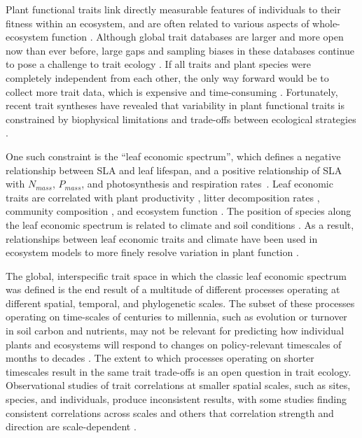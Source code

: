 \documentclass{article}
\begin{document}
Plant functional traits link directly measurable features of individuals to their fitness within an ecosystem, and are often related to various aspects of whole-ecosystem function \citep{violle_2007_let,cardinale_2012_biodiversity}.
Although global trait databases are larger and more open now than ever before, large gaps and sampling biases in these databases continue to pose a challenge to trait ecology \citep{cornwell_2019_what}.
If all traits and plant species were completely independent from each other, the only way forward would be to collect more trait data, which is expensive and time-consuming \citep{cornwell_2019_what}.
Fortunately, recent trait syntheses have revealed that variability in plant functional traits is constrained by biophysical limitations and trade-offs between ecological strategies \citep{kattge_2011_try,wright_2004_worldwide,kleyer_2015_why,diaz_2015_global}.

One such constraint is the ``leaf economic spectrum'', which defines a negative relationship between SLA and leaf lifespan, and a positive relationship of SLA with $N_{mass}$, $P_{mass}$, and photosynthesis and respiration rates~\citep{wright_2004_worldwide,shipley_2006_fundamental,reich_2014_world,diaz_2015_global}.
Leaf economic traits are correlated with
plant productivity \citep{shipley_2005_functional,niinemets_2016_within,wu_2016_convergence},
litter decomposition rates \citep{bakker_2010_leaf,hobbie_2015_plant},
community composition \citep{burns_2004_patterns,cavender-bares_2004_multiple},
and ecosystem function \citep{diaz_2004_plant,musavi_2015_imprint}.
The position of species along the leaf economic spectrum is related to climate and soil conditions
\citep{wright_2004_worldwide,wright_2005_modulation,cornwell_2009_community,ordonez_2009_global,wigley_2016_leaf}.
As a result, relationships between leaf economic traits and climate have been used in ecosystem models to more finely resolve variation in plant function \citep{sakschewski_2015_leaf,verheijen_2015_inclusion,scheiter_2013_next}.

The global, interspecific trait space in which the classic leaf economic spectrum was defined is the end result of a multitude of different processes operating at different spatial, temporal, and phylogenetic scales.
The subset of these processes operating on time-scales of centuries to millennia, such as evolution or turnover in soil carbon and nutrients,
may not be relevant for predicting how individual plants and ecosystems will respond to changes on policy-relevant timescales of months to decades \citep{shaw_2012_rapid}.
The extent to which processes operating on shorter timescales result in the same trait trade-offs is an open question in trait ecology.
Observational studies of trait correlations at smaller spatial scales, such as sites, species, and individuals, produce inconsistent results,
with some studies finding consistent correlations across scales \citep{wright_2004_worldwide,albert_2010_multi,asner_2014_amazonian}
and others that correlation strength and direction are scale-dependent  \citep{albert_2010_intraspecific_functional_variability,messier_2010_how,wright_2012_does,feng_2013_scale,grubb_2015_relationships,wigley_2016_leaf,messier_2017_interspecific,kichenin_2013_contrasting}.
\end{document}

